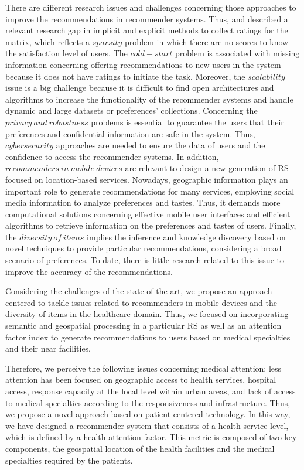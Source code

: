 \documentclass[sustainability,article,submit,pdftex,moreauthors]{Definitions/mdpi}
\begin{document}
{There are different research issues and challenges concerning those approaches to improve the recommendations in recommender systems. Thus, \citet{kumar2016approaches} and \citet{lika2014facing} described a relevant research gap in implicit and explicit methods to collect ratings for the matrix, which reflects a $sparsity$ problem in which there are no scores to know the satisfaction level of users. The $cold-start$ problem is associated with missing information concerning offering recommendations to new users in the system because it does not have ratings to initiate the task. Moreover, the $scalability$ issue is a big challenge because it is difficult to find open architectures and algorithms to increase the functionality of the recommender systems and handle dynamic and large datasets or preferences’ collections. Concerning the $privacy\ and\ robustness$ problems is essential to guarantee the users that their preferences and confidential information are safe in the system. Thus, $cybersecurity$ approaches are needed to ensure the data of users and the confidence to access the recommender systems. In addition, $recommenders\ in\ mobile\ devices$ are relevant to design a new generation of RS focused on location-based services. Nowadays, geographic information plays an important role to generate recommendations for many services, employing social media information to analyze preferences and tastes. Thus, it demands more computational solutions concerning effective mobile user interfaces and efficient algorithms to retrieve information on the preferences and tastes of users. Finally, the $diversity\ of\ items$ implies the inference and knowledge discovery based on novel techniques to provide particular recommendations, considering a broad scenario of preferences. To date, there is little research related to this issue to improve the accuracy of the recommendations.}

{Considering the challenges of the state-of-the-art, we propose an approach centered to tackle issues related to recommenders in mobile devices and the diversity of items in the healthcare domain. Thus, we focused on incorporating semantic and geospatial processing in a particular RS as well as an attention factor index to generate recommendations to users based on medical specialties and their near facilities.}

Therefore, we perceive the following issues concerning medical attention: less attention has been focused on geographic access to health services, hospital access, response capacity at the local level within urban areas, and lack of access to medical specialties according to the responsiveness and infrastructure. Thus, we propose a novel approach based on patient-centered technology. In this way, we have designed a recommender system that consists of a health service level, which is defined by a health attention factor. This metric is composed of two key components, the geospatial location of the health facilities and the medical specialties required by the patients.
\end{document}
